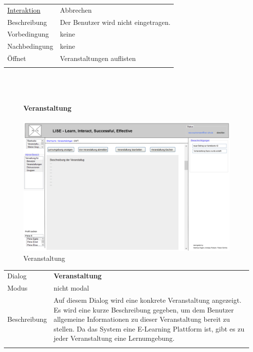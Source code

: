 \documentclass[12pt,a4paper]{article}
\begin{document}
{\begin{tabular}{l p{12cm}}
\underline{Interaktion}  	 & Abbrechen\\ 
Beschreibung   	 & Der Benutzer wird nicht eingetragen.  \\
Vorbedingung	 & keine \\
Nachbedingung	 & keine \\
Öffnet			 & \glqq Veranstaltungen auflisten\grqq \\\\

\end{tabular}\\\\

\begin{figure}[H]
	\centering
	\paragraph{Veranstaltung}
	\includegraphics[width=\textwidth]{Bilder/Mockups/GUI/Veranstaltung.png}
	\caption{Veranstaltung}
	\label{Veranstaltung}
\end{figure}

\begin{tabular}{l p{12cm}}
Dialog 	 & \textbf{Veranstaltung} \\ 
Modus & nicht modal\\ 
Beschreibung   	 & Auf diesem Dialog wird eine konkrete Veranstaltung angezeigt. Es wird eine kurze Beschreibung gegeben, um dem Benutzer allgemeine Informationen zu dieser Veranstaltung bereit zu stellen. Da das System eine E-Learning Plattform ist, gibt es zu jeder Veranstaltung eine Lernumgebung.\\\\ 


\end{tabular}}
\end{document}
